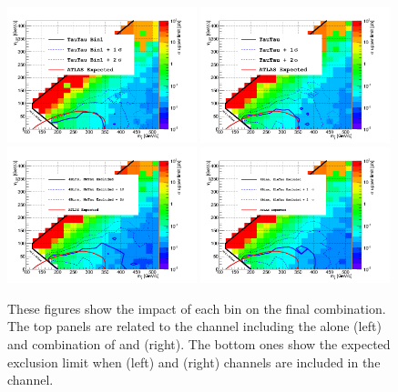 \begin{linenomath}
\begin{figure}[h]
\centering
\includegraphics[width=0.49\textwidth,keepaspectratio=true]{StatisticsFig/RealisticsSystematics/Exclusion_TauTauBin1Rel.png}
\includegraphics[width=0.49\textwidth,keepaspectratio=true]{StatisticsFig/RealisticsSystematics/Exclusion_TauTauBin1Rel_Bin2.png}
\includegraphics[width=0.49\textwidth,keepaspectratio=true]{StatisticsFig/RealisticsSystematics/Exclusion4Bins_MuTauExcl.png}
\includegraphics[width=0.49\textwidth,keepaspectratio=true]{StatisticsFig/RealisticsSystematics/Exclusion4Bins_EleTauExcl.png}
\caption{These figures show the impact of each bin on the final combination. 
The top panels are related to the \tauTau channel including the \binone alone (left) and combination of \binone and \bintwo (right).
The bottom ones show the expected exclusion limit when \eTau (left) and \muTau (right) channels are included in the \tauTau channel.
}
\label{fig:limit_bins}
\end{figure}
\end{linenomath}


